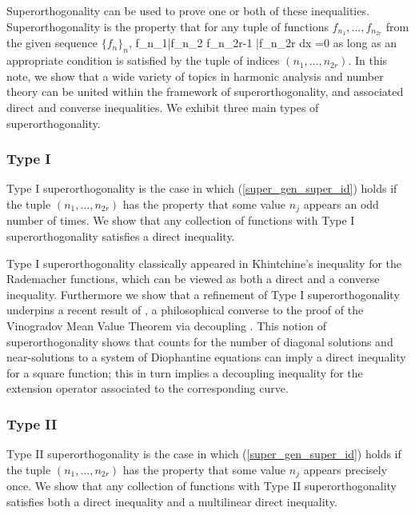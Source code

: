 \documentclass[oneside,11pt]{amsart}
\begin{document}
Superorthogonality can be used to prove one or both of these inequalities.  
Superorthogonality  is the property that 
 for any  tuple of functions $f_{n_1}, \ldots, f_{n_{2r}}$ from the given sequence $\{f_n\}_n$,
 \beq\label{super_gen_super_id}
 \int f_{n_1}\bar{f}_{n_2} \cdots f_{n_{2r-1}} \bar{f}_{n_{2r}} dx =0 
 \eeq
as long as an appropriate condition is satisfied by the tuple of indices $(n_1, \ldots,  n_{2r})$. 
In this note,    we show that a wide variety of topics in harmonic analysis and number theory can be united within the framework of superorthogonality, and associated direct and converse inequalities.
We exhibit three main types of superorthogonality.\\

\subsubsection*{Type I}
Type I superorthogonality is the case in which (\ref{super_gen_super_id}) holds if the tuple $(n_1, \ldots, n_{2r})$ has the property that some value $n_j$ appears an odd number of times.
We show that any collection of functions with Type I superorthogonality satisfies a direct inequality. 

 Type I superorthogonality classically appeared in Khintchine's inequality for the Rademacher functions, which can be viewed as both a direct and a converse inequality. 
 Furthermore we show that a refinement of Type I superorthogonality   underpins a  recent result of \cite{GGPRY19x}, a philosophical converse to the   proof of the Vinogradov Mean Value Theorem via decoupling  \cite{BDG16}. This notion of superorthogonality shows that   counts for the number of diagonal solutions and near-solutions to a system of Diophantine equations  can imply a direct inequality for a square function; this in turn implies a decoupling inequality  for the extension operator associated to the corresponding curve.\\


\subsubsection*{Type II} Type II superorthogonality is the case in which  (\ref{super_gen_super_id}) holds if the tuple $(n_1, \ldots, n_{2r})$ has the property that some value $n_j$ appears precisely once.  We show that any collection of functions with Type II superorthogonality satisfies both a direct inequality and a  multilinear direct inequality.
\end{document}

